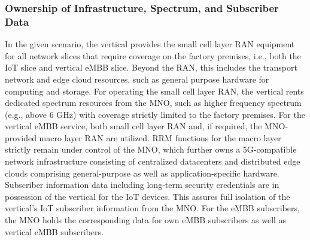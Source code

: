 \documentclass{report}
\begin{document}
\subsubsection{Ownership of Infrastructure, Spectrum, and Subscriber Data}
In the given scenario, the vertical provides the small cell layer RAN equipment for all network slices
that require coverage on the factory premises, i.e., both the IoT slice and vertical eMBB slice. Beyond
the RAN, this includes the transport network and edge cloud resources, such as general purpose
hardware for computing and storage. For operating the small cell layer RAN, the vertical rents dedicated spectrum resources from the MNO, such as higher frequency spectrum (e.g., above 6 GHz)
with coverage strictly limited to the factory premises. For the vertical eMBB service, both small cell
layer RAN and, if required, the MNO‐provided macro layer RAN are utilized. \gls{RRM} functions for the
macro layer strictly remain under control of the MNO, which further owns a 5G‐compatible network infrastructure consisting of centralized datacenters and distributed edge clouds comprising general-purpose as well as application‐specific hardware.\\ Subscriber information data including long‐term security credentials are in possession of the vertical for the IoT devices. This assures full isolation of
the vertical’s IoT subscriber information from the MNO. For the eMBB subscribers, the MNO holds
the corresponding data for own eMBB subscribers as well as vertical eMBB subscribers.
\end{document}
